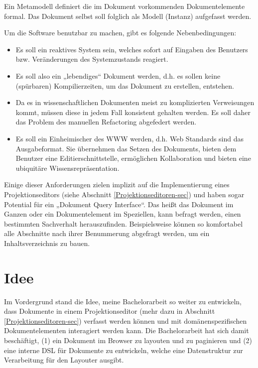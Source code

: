  
Ein Metamodell definiert die im Dokument vorkommenden Dokumentelemente formal. Das Dokument selbst soll folglich als Modell (Instanz) aufgefasst werden.

 
Um die Software benutzbar zu machen, gibt es folgende Nebenbedingungen:

 
\begin{itemize}

\item Es soll ein reaktives System sein, welches sofort auf Eingaben des Benutzers bzw. Veränderungen des Systemzustands reagiert.
\item Es soll also ein „lebendiges“ Dokument werden, d.h. es sollen keine (spürbaren) Kompilierzeiten, um das Dokument zu erstellen, entstehen.
\item Da es in wissenschaftlichen Dokumenten meist zu komplizierten Verweisungen kommt, müssen diese in jedem Fall konsistent gehalten werden. Es soll daher das Problem des manuellen Refactoring abgefedert werden.
\item Es soll ein Einheimischer des WWW werden, d.h. Web Standards sind das Ausgabeformat. Sie übernehmen das Setzen des Dokuments, bieten dem Benutzer eine Editierschnittstelle, ermöglichen Kollaboration und bieten eine ubiquitäre Wissensrepräsentation.
\end{itemize}
 
Einige dieser Anforderungen zielen implizit auf die Implementierung eines Projektionseditors (siehe Abschnitt \ref{Projektionseditoren-sec}) und haben sogar Potential für ein „Dokument Query Interface“. Das heißt das Dokument im Ganzen oder ein Dokumentelement im Speziellen, kann befragt werden, einen bestimmten Sachverhalt herauszufinden. Beispielsweise können so komfortabel alle Abschnitte nach ihrer Benummerung abgefragt werden, um ein Inhaltsverzeichnis zu bauen.

 
\section{Idee}\label{}
 
Im Vordergrund stand die Idee, meine Bachelorarbeit \citep{Hodapp} so weiter zu entwickeln, dass Dokumente in einem Projektionseditor (mehr dazu in Abschnitt \ref{Projektionseditoren-sec}) verfasst werden können und mit domänenspezifischen Dokumentelementen interagiert werden kann. Die Bachelorarbeit hat sich damit beschäftigt, (1) ein Dokument im Browser zu layouten und zu paginieren und (2) eine interne DSL für Dokumente zu entwickeln, welche eine Datenstruktur zur Verarbeitung für den Layouter ausgibt.


